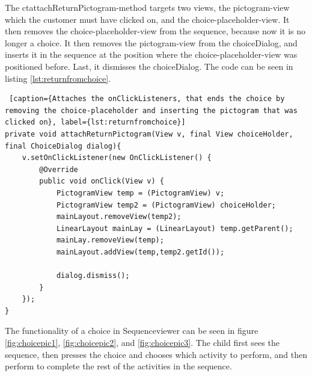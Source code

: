 The ct{attachReturnPictogram}-method targets two views, the pictogram-view which the customer must have clicked on, and the choice-placeholder-view. It then removes the choice-placeholder-view from the sequence, because now it is no longer a choice. It then removes the pictogram-view from the choiceDialog, and inserts it in the sequence at the position where the choice-placeholder-view was positioned before. Last, it dismisses the choiceDialog.  The code can be seen in listing \ref{lst:returnfromchoice}.

\begin{lstlisting} [caption={Attaches the onClickListeners, that ends the choice by removing the choice-placeholder and inserting the pictogram that was clicked on}, label={lst:returnfromchoice}]
private void attachReturnPictogram(View v, final View choiceHolder, final ChoiceDialog dialog){
	v.setOnClickListener(new OnClickListener() {
		@Override
		public void onClick(View v) {
			PictogramView temp = (PictogramView) v;
			PictogramView temp2 = (PictogramView) choiceHolder;
			mainLayout.removeView(temp2);
			LinearLayout mainLay = (LinearLayout) temp.getParent();
			mainLay.removeView(temp);
			mainLayout.addView(temp,temp2.getId());

			dialog.dismiss();
		}
	});
}
\end{lstlisting}

The functionality of a choice in Sequenceviewer can be seen in figure \ref{fig:choicepic1}, \ref{fig:choicepic2}, and \ref{fig:choicepic3}. The child first sees the sequence, then presses the choice and chooses which activity to perform, and then perform to complete the rest of the activities in the sequence.

